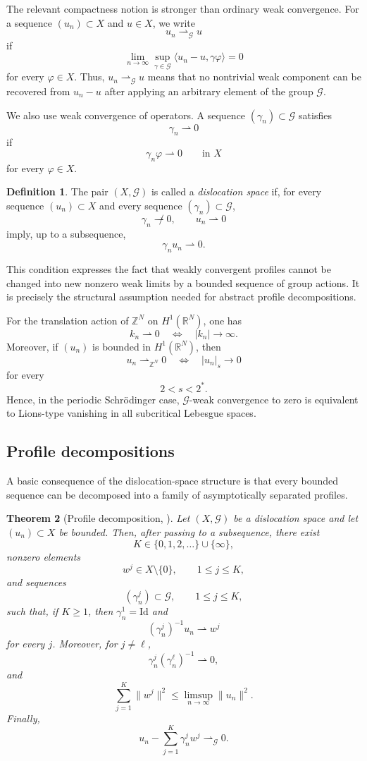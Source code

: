 \documentclass[11pt]{amsart}
\numberwithin{equation}{section}
\newtheorem{theorem}{Theorem}[section]
\theoremstyle{definition}
\newtheorem{definition}[theorem]{Definition}
\newcommand{\R}{\mathbb{R}}
\newcommand{\Z}{\mathbb{Z}}
\newcommand{\cG}{\mathcal{G}}
\begin{document}
The relevant compactness notion is stronger than ordinary weak convergence.
For a sequence $(u_n)\subset X$ and $u\in X$, we write
\[
u_n\rightharpoonup_{\cG} u
\]
if
\[
\lim_{n\to\infty}
\sup_{\gamma\in\cG}
\langle u_n-u,\gamma\varphi\rangle
=0
\]
for every $\varphi\in X$. Thus, $u_n\rightharpoonup_{\cG} u$ means that no
nontrivial weak component can be recovered from $u_n-u$ after applying an
arbitrary element of the group $\cG$.

We also use weak convergence of operators. A sequence $(\gamma_n)\subset\cG$
satisfies
\[
\gamma_n\rightharpoonup 0
\]
if
\[
\gamma_n\varphi\rightharpoonup 0
\qquad\text{in }X
\]
for every $\varphi\in X$.

\begin{definition}
The pair $(X,\cG)$ is called a \emph{dislocation space} if, for every
sequence $(u_n)\subset X$ and every sequence $(\gamma_n)\subset\cG$,
\[
\gamma_n\not\rightharpoonup 0,
\qquad
u_n\rightharpoonup 0
\]
imply, up to a subsequence,
\[
\gamma_nu_n\rightharpoonup 0.
\]
\end{definition}

This condition expresses the fact that weakly convergent profiles cannot
be changed into new nonzero weak limits by a bounded sequence of group
actions. It is precisely the structural assumption needed for abstract
profile decompositions.

For the translation action of $\Z^N$ on $H^1(\R^N)$, one has
\[
k_n\rightharpoonup 0
\quad\Longleftrightarrow\quad
|k_n|\to\infty.
\]
Moreover, if $(u_n)$ is bounded in $H^1(\R^N)$, then
\[
u_n\rightharpoonup_{\Z^N}0
\quad\Longleftrightarrow\quad
|u_n|_s\to0
\]
for every
\[
2<s<2^*.
\]
Hence, in the periodic Schr\"odinger case, $\cG$-weak convergence to zero is
equivalent to Lions-type vanishing in all subcritical Lebesgue spaces.

\subsection{Profile decompositions}

A basic consequence of the dislocation-space structure is that every
bounded sequence can be decomposed into a family of asymptotically
separated profiles.

\begin{theorem}[Profile decomposition, {\cite[Theorem 3.1]{TintarevFieseler}}]
Let $(X,\cG)$ be a dislocation space and let $(u_n)\subset X$ be bounded.
Then, after passing to a subsequence, there exist
\[
K\in\{0,1,2,\ldots\}\cup\{\infty\},
\]
nonzero elements
\[
w^j\in X\setminus\{0\},
\qquad
1\leq j\leq K,
\]
and sequences
\[
(\gamma_n^j)\subset\cG,
\qquad
1\leq j\leq K,
\]
such that, if $K\geq1$, then $\gamma_n^1=\mathrm{Id}$ and
\[
(\gamma_n^j)^{-1}u_n\rightharpoonup w^j
\]
for every $j$. Moreover, for $j\neq\ell$,
\[
\gamma_n^j(\gamma_n^\ell)^{-1}\rightharpoonup0,
\]
and
\[
\sum_{j=1}^K\|w^j\|^2
\leq
\limsup_{n\to\infty}\|u_n\|^2.
\]
Finally,
\[
u_n-\sum_{j=1}^K \gamma_n^j w^j
\rightharpoonup_{\cG}0.
\]
\end{theorem}
\end{document}
